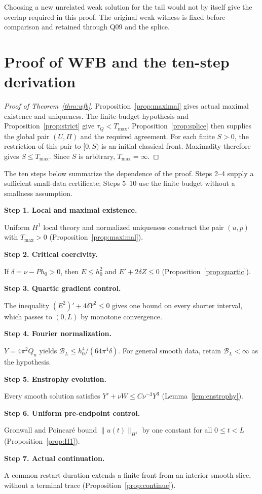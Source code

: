 \documentclass[11pt,a4paper]{article}
\numberwithin{equation}{section}
\theoremstyle{plain}
\theoremstyle{definition}
\theoremstyle{remark}
\newcommand{\norm}[2]{\lVert #1\rVert_{#2}}
\newcommand{\Tmax}{T_{\max}}
\newcommand{\tq}{\tau_Q}
\newcommand{\Budget}{\mathcal B}
\newcommand{\step}[2]{\par\medskip\noindent\textbf{Step #1. #2}\par\smallskip}
\begin{document}
Choosing a new unrelated weak solution for the tail would not by itself
give the overlap required in this proof. The original weak witness is
fixed before comparison and retained through Q09 and the splice.

\section{Proof of WFB and the ten-step derivation}\label{sec:proof}
\begin{proof}[Proof of Theorem~\ref{thm:wfb}]
Proposition~\ref{prop:maximal} gives actual maximal existence and
uniqueness. The finite-budget hypothesis and Proposition~\ref{prop:strict}
give $\tq<\Tmax$. Proposition~\ref{prop:splice} then supplies the
global pair $(U,\Pi)$ and the required agreement. For each finite $S>0$,
the restriction of this pair to $[0,S)$ is an initial classical front.
Maximality therefore gives $S\le\Tmax$. Since $S$ is arbitrary,
$\Tmax=\infty$.
\end{proof}

The ten steps below summarize the dependence of the proof. Steps 2--4
supply a sufficient small-data certificate; Steps 5--10 use the finite
budget without a smallness assumption.

\step{1}{Local and maximal existence.}
Uniform $H^1$ local theory and normalized uniqueness construct the pair
$(u,p)$ with $\Tmax>0$ (Proposition~\ref{prop:maximal}).

\step{2}{Critical coercivity.}
If $\delta=\nu-Ph_0>0$, then $E\le h_0^2$ and
$E'+2\delta Z\le0$ (Proposition~\ref{prop:quartic}).

\step{3}{Quartic gradient control.}
The inequality $(E^2)'+4\delta Y^2\le0$ gives one bound on every
shorter interval, which passes to $(0,L)$ by monotone convergence.

\step{4}{Fourier normalization.}
$Y=4\pi^2Q_u$ yields $\Budget_L\le h_0^4/(64\pi^4\delta)$.
For general smooth data, retain $\Budget_L<\infty$ as the hypothesis.

\step{5}{Enstrophy evolution.}
Every smooth solution satisfies $Y'+\nu W\le C\nu^{-3}Y^3$
(Lemma~\ref{lem:enstrophy}).

\step{6}{Uniform pre-endpoint control.}
Gronwall and Poincar\'e bound $\norm{u(t)}{H^1}$ by one constant for
all $0\le t<L$ (Proposition~\ref{prop:H1}).

\step{7}{Actual continuation.}
A common restart duration extends a finite front from an interior
smooth slice, without a terminal trace (Proposition~\ref{prop:continue}).
\end{document}
